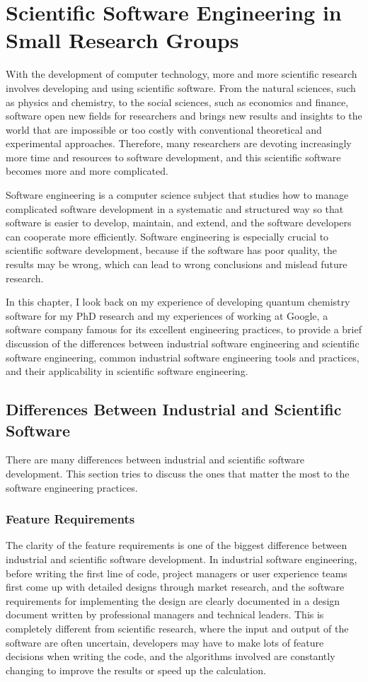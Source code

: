 \chapter{Scientific Software Engineering in Small Research Groups}
With the development of computer technology, more and more scientific research involves developing and using scientific software.
From the natural sciences, such as physics and chemistry, to the social sciences, such as economics and finance, software open new fields for researchers and brings new results and insights to the world that are impossible or too costly with conventional theoretical and experimental approaches.
Therefore, many researchers are devoting increasingly more time and resources to software development, and this scientific software becomes more and more complicated.

Software engineering is a computer science subject that studies how to manage complicated software development in a systematic and structured way so that software is easier to develop, maintain, and extend, and the software developers can cooperate more efficiently.
Software engineering is especially crucial to scientific software development, because if the software has poor quality, the results may be wrong, which can lead to wrong conclusions and mislead future research.

In this chapter, I look back on my experience of developing quantum chemistry software for my PhD research and my experiences of working at Google, a software company famous for its excellent engineering practices, to provide a brief discussion of the differences between industrial software engineering and scientific software engineering, common industrial software engineering tools and practices, and their applicability in scientific software engineering.

\section{Differences Between Industrial and Scientific Software}

There are many differences between industrial and scientific software development.
This section tries to discuss the ones that matter the most to the software engineering practices.

\subsection{Feature Requirements}
The clarity of the feature requirements is one of the biggest difference between industrial and scientific software development.
In industrial software engineering, before writing the first line of code, project managers or user experience teams first come up with detailed designs through market research, and the software requirements for implementing the design are clearly documented in a design document written by professional managers and technical leaders.
This is completely different from scientific research, where the input and output of the software are often uncertain, developers may have to make lots of feature decisions when writing the code, and the algorithms involved are constantly changing to improve the results or speed up the calculation.

